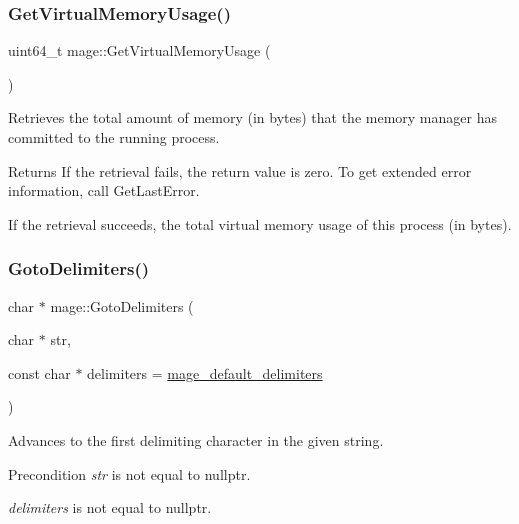 \subsubsection{\texorpdfstring{Get\+Virtual\+Memory\+Usage()}{GetVirtualMemoryUsage()}}
{\footnotesize\ttfamily uint64\+\_\+t mage\+::\+Get\+Virtual\+Memory\+Usage (\begin{DoxyParamCaption}{ }\end{DoxyParamCaption})}

Retrieves the total amount of memory (in bytes) that the memory manager has committed to the running process.

\begin{DoxyReturn}{Returns}
If the retrieval fails, the return value is zero. To get extended error information, call Get\+Last\+Error. 

If the retrieval succeeds, the total virtual memory usage of this process (in bytes). 
\end{DoxyReturn}
\hypertarget{namespacemage_a1f8c73ddfbe8a370be1800627136b2ca}{}\label{namespacemage_a1f8c73ddfbe8a370be1800627136b2ca} 
\subsubsection{\texorpdfstring{Goto\+Delimiters()}{GotoDelimiters()}\hspace{0.1cm}{\footnotesize\ttfamily [1/2]}}
{\footnotesize\ttfamily char $\ast$ mage\+::\+Goto\+Delimiters (\begin{DoxyParamCaption}\item[{char $\ast$}]{str,  }\item[{const char $\ast$}]{delimiters = {\ttfamily \hyperlink{namespacemage_ae247ad66af37a4b0d67ddca9404ca01a}{mage\+\_\+default\+\_\+delimiters}} }\end{DoxyParamCaption})}

Advances to the first delimiting character in the given string.

\begin{DoxyPrecond}{Precondition}
{\itshape str} is not equal to {\ttfamily nullptr}. 

{\itshape delimiters} is not equal to {\ttfamily nullptr}. 
\end{DoxyPrecond}

